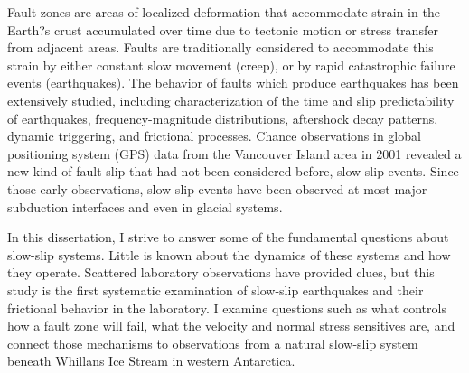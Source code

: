 \documentclass[11pt]{psuthesis}
\begin{document}
\begin{frontmatter}


\begin{doublespace}
\titlepage
\end{doublespace}

\committeepage

\abstract

Fault zones are areas of localized deformation that accommodate strain in the Earth?s crust accumulated over time due to tectonic motion or stress transfer from adjacent areas. Faults are traditionally considered to accommodate this strain by either constant slow movement (creep), or by rapid catastrophic failure events (earthquakes). The behavior of faults which produce earthquakes has been extensively studied, including characterization of the time and slip predictability of earthquakes, frequency-magnitude distributions, aftershock decay patterns, dynamic triggering, and frictional processes. Chance observations in global positioning system (GPS) data from the Vancouver Island area in 2001 revealed a new kind of fault slip that had not been considered before, slow slip events. Since those early observations, slow-slip events have been observed at most major subduction interfaces and even in glacial systems. 

In this dissertation, I strive to answer some of the fundamental questions about slow-slip systems. Little is known about the dynamics of these systems and how they operate. Scattered laboratory observations have provided clues, but this study is the first systematic examination of slow-slip earthquakes and their frictional behavior in the laboratory. I examine questions such as what controls how a fault zone will fail, what the velocity and normal stress sensitives are, and connect those mechanisms to observations from a natural slow-slip system beneath Whillans Ice Stream in western Antarctica.


\end{frontmatter}
\end{document}
